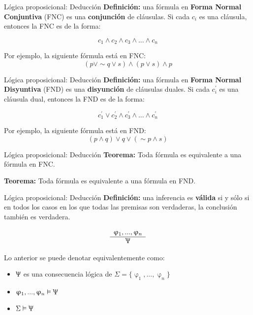 \documentclass{beamer}
\begin{document}
\begin{frame}{Lógica proposicional: Deducción}
  \textbf{Definición:} una fórmula en \textbf{Forma Normal Conjuntiva} (FNC) es
  una \textbf{conjunción} de cláusulas. Si cada $c_{i}$ es una cláusula,
  entonces la FNC es de la forma:

  $$c_{1} \land c_{2} \land c_{3} \land ... \land c_{n}$$

  Por ejemplo, la siguiente fórmula está en FNC:
  $$(p \vee \sim q \vee s) \land (p \vee s) \land p$$
\end{frame}


\begin{frame}{Lógica proposicional: Deducción}
  \textbf{Definición:} una fórmula en \textbf{Forma Normal Disyuntiva} (FND) es
  una \textbf{disyunción} de cláusulas duales. Si cada $c^{'}_{i}$ es una
  cláusula dual, entonces la FND es de la forma:

  $$c^{'}_{1} \vee c^{'}_{2} \land c^{'}_{3} \land ... \land c^{'}_{n}$$

  Por ejemplo, la siguiente fórmula está en FND:
  $$(p \land q) \vee q \vee (\sim p \land s)$$
\end{frame}


\begin{frame}{Lógica proposicional: Deducción}
  \textbf{Teorema:} Toda fórmula es equivalente a una fórmula en FNC.

  \vspace{1cm}

  \textbf{Teorema:} Toda fórmula es equivalente a una fórmula en FND.
\end{frame}


\begin{frame}{Lógica proposicional: Deducción}
  \textbf{Definición:} una inferencia es \textbf{válida} si y sólo si en todos
  los casos en los que todas las premisas son verdaderas, la conclusión también
  es verdadera.

  \[
    \begin{array}{c}
      \upvarphi_{1}, ..., \upvarphi_{n}\\
      \hline
      \Uppsi
    \end{array}
  \]

  Lo anterior se puede denotar equivalentemente como:
  \begin{itemize}
    \item $\Uppsi$ es una consecuencia lógica de
          $\Sigma = \{\upvarphi_{1}, ..., \upvarphi_{n}\}$
    \item $\upvarphi_{1}, ..., \upvarphi_{n} \vDash \Uppsi$
    \item $\Sigma \vDash \Uppsi$
  \end{itemize}
\end{frame}
\end{document}
